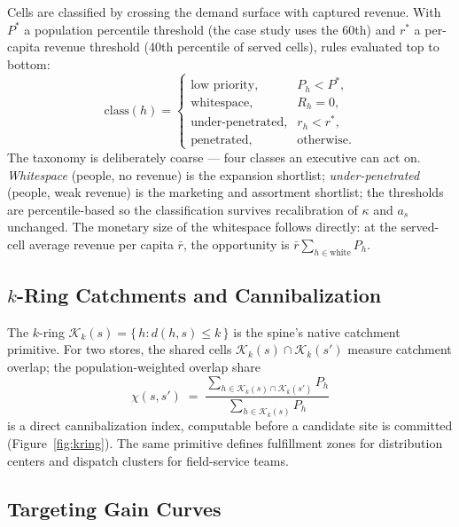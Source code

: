\documentclass[11pt,a4paper,twocolumn]{article}
\begin{document}
Cells are classified by crossing the demand surface with captured revenue.
With $P^{*}$ a population percentile threshold (the case study uses the
60th) and $r^{*}$ a per-capita revenue threshold (40th percentile of
served cells), rules evaluated top to bottom:
\begin{equation}
  \label{eq:class}
  \mathrm{class}(h) =
  \begin{cases}
    \text{low priority}, & P_h < P^{*},\\[0.2em]
    \text{whitespace}, & R_h = 0,\\[0.2em]
    \text{under-penetrated}, & r_h < r^{*},\\[0.2em]
    \text{penetrated}, & \text{otherwise.}
  \end{cases}
\end{equation}
The taxonomy is deliberately coarse --- four classes an executive can act
on. \emph{Whitespace} (people, no revenue) is the expansion shortlist;
\emph{under-penetrated} (people, weak revenue) is the marketing and
assortment shortlist; the thresholds are percentile-based so the
classification survives recalibration of $\kappa$ and $a_s$ unchanged.
The monetary size of the whitespace follows directly: at the served-cell
average revenue per capita $\bar{r}$, the opportunity is
$\bar{r} \sum_{h \in \mathrm{white}} P_h$.

\subsection{$k$-Ring Catchments and Cannibalization}

The $k$-ring $\mathcal{K}_k(s) = \{\,h : d(h,s) \le k\,\}$ is the spine's
native catchment primitive. For two stores, the shared cells
$\mathcal{K}_k(s) \cap \mathcal{K}_k(s')$ measure catchment overlap; the
population-weighted overlap share
\begin{equation}
  \label{eq:cannibal}
  \chi(s,s') \;=\;
  \frac{\sum_{h \in \mathcal{K}_k(s) \cap \mathcal{K}_k(s')} P_h}
       {\sum_{h \in \mathcal{K}_k(s)} P_h}
\end{equation}
is a direct cannibalization index, computable before a candidate site is
committed (Figure~\ref{fig:kring}). The same primitive defines
fulfillment zones for distribution centers and dispatch clusters for
field-service teams.

\subsection{Targeting Gain Curves}
\end{document}

